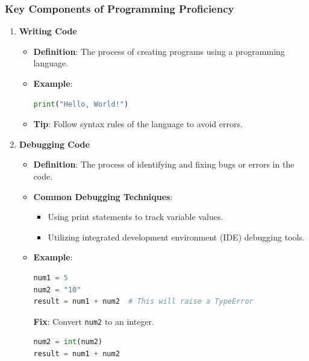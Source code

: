 \documentclass{beamer}
\begin{document}
\begin{frame}[fragile]
    \frametitle{Key Components of Programming Proficiency}
    \begin{enumerate}
        \item \textbf{Writing Code}
            \begin{itemize}
                \item \textbf{Definition}: The process of creating programs using a programming language.
                \item \textbf{Example}:
                \begin{lstlisting}[language=python]
print("Hello, World!")
                \end{lstlisting}
                \item \textbf{Tip}: Follow syntax rules of the language to avoid errors.
            \end{itemize}
    
        \item \textbf{Debugging Code}
            \begin{itemize}
                \item \textbf{Definition}: The process of identifying and fixing bugs or errors in the code.
                \item \textbf{Common Debugging Techniques}:
                \begin{itemize}
                    \item Using print statements to track variable values.
                    \item Utilizing integrated development environment (IDE) debugging tools.
                \end{itemize}
                \item \textbf{Example}:
                \begin{lstlisting}[language=python]
num1 = 5
num2 = "10"
result = num1 + num2  # This will raise a TypeError
                \end{lstlisting}
                \textbf{Fix}: Convert \texttt{num2} to an integer.
                \begin{lstlisting}[language=python]
num2 = int(num2)
result = num1 + num2
                \end{lstlisting}
            \end{itemize}
    \end{enumerate}
\end{frame}
\end{document}
